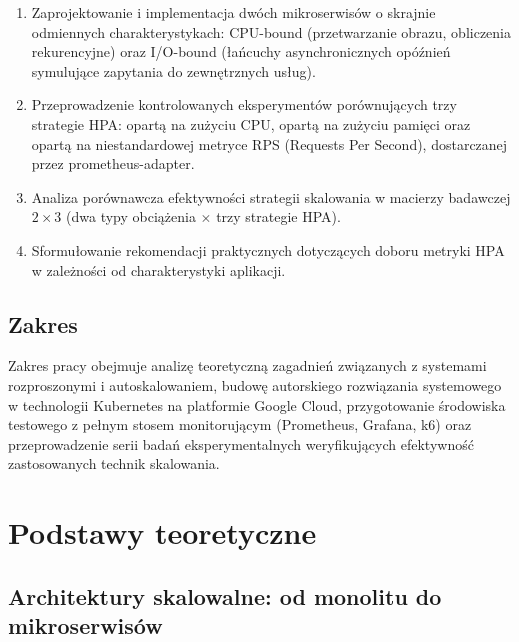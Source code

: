 \begin{enumerate}
  \item Zaprojektowanie i implementacja dwóch mikroserwisów o skrajnie odmiennych charakterystykach: CPU-bound (przetwarzanie obrazu, obliczenia rekurencyjne) oraz I/O-bound (łańcuchy asynchronicznych opóźnień symulujące zapytania do zewnętrznych usług).
  \item Przeprowadzenie kontrolowanych eksperymentów porównujących trzy strategie HPA: opartą na zużyciu CPU, opartą na zużyciu pamięci oraz opartą na niestandardowej metryce RPS (Requests Per Second), dostarczanej przez prometheus-adapter.
  \item Analiza porównawcza efektywności strategii skalowania w macierzy badawczej $2 \times 3$ (dwa typy obciążenia $\times$ trzy strategie HPA).
  \item Sformułowanie rekomendacji praktycznych dotyczących doboru metryki HPA w zależności od charakterystyki aplikacji.
\end{enumerate}

\subsection{Zakres}

Zakres pracy obejmuje analizę teoretyczną zagadnień związanych z systemami rozproszonymi i autoskalowaniem, budowę autorskiego rozwiązania systemowego w technologii Kubernetes na platformie Google Cloud, przygotowanie środowiska testowego z pełnym stosem monitorującym (Prometheus, Grafana, k6) oraz przeprowadzenie serii badań eksperymentalnych weryfikujących efektywność zastosowanych technik skalowania.

\section{Podstawy teoretyczne}

\subsection{Architektury skalowalne: od monolitu do mikroserwisów}

